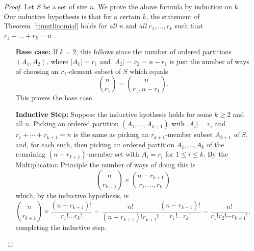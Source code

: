 \documentclass[11pt,dvipsnames]{book}
\numberwithin{figure}{section} %
\numberwithin{table}{section} %
\begin{document}
\begin{proof}
Let $S$ be a set of size $n$. We prove the above formula by induction on $k$. Our inductive hypothesis is that for a certain $k$, the statement of Theorem~\ref{t:mutlinomial} holds for {\em all} $n$ and {\em all} $r_1, \dots , r_k$ such that $r_1 + \dots + r_k = n$ .
\begin{itemize}
\item[{\bf Base case:}] If $k=2$, this follows since the number of ordered partitions $(A_{1},A_{2})$, where $|A_{1}|=r_{1}$ and $|A_{2}|=r_{2}=n-r_{1}$
is just the number of ways of choosing an $r_1$-element subset of $S$ which equals
$${n \choose {r_1}} = {n \choose {r_1, n-r_1}}.$$
This proves the base case.
\item[{\bf Inductive Step:}] Suppose the inductive hyothesis holds for some $k\geq 2$ and all $n$. Picking an ordered partition $(A_{1}, \dots,A_{k+1})$ with $|A_{i}|=r_i$ and $r_{1}+\cdots + r_{k+1}=n$ is the same as picking an $r_{k+1}$-member subset $A_{k+1}$ of $S$, and, for each such, then picking an ordered partition $A_1, \dots , A_k$ of the remaining $(n - r_{k+1})$-member set with $A_i = r_i$ for $1 \leq i \leq k$. By the Multiplication Principle the number of ways of doing this is
$$ { n \choose r_{k+1}} \times  {n- r_{k+1} \choose r_1, \dots , r_{k}}$$
which, by the inductive hypothesis, is
$$ { n \choose r_{k+1}} \times \frac{(n- r_{k+1})!}{ r_1! \dots r_{k}!}= \frac{n!}{(n-r_{k+1})! r_{k+1}!}\frac{(n- r_{k+1})!}{ r_1! \dots r_{k}!}=
\frac{n!}{r_{1}!r_{2}!\cdots r_{k+1}!},$$
completing the inductive step.
\end{itemize}
\end{proof}
%
\end{document}

